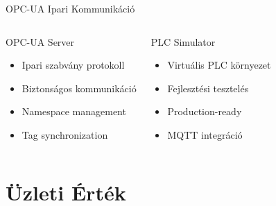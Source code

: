 \documentclass[aspectratio=169,10pt]{beamer}
\begin{document}
\begin{frame}{OPC-UA Ipari Kommunikáció}
    \begin{columns}[c]
        \begin{block}{OPC-UA Server}
            \begin{itemize}
                \item Ipari szabvány protokoll
                \item Biztonságos kommunikáció
                \item Namespace management
                \item Tag synchronization
            \end{itemize}
        \end{block}
        
        \begin{block}{PLC Simulator}
            \begin{itemize}
                \item Virtuális PLC környezet
                \item Fejlesztési tesztelés
                \item Production-ready
                \item MQTT integráció
            \end{itemize}
        \end{block}
    \end{columns}
\end{frame}

\section{Üzleti Érték}
\end{document}
